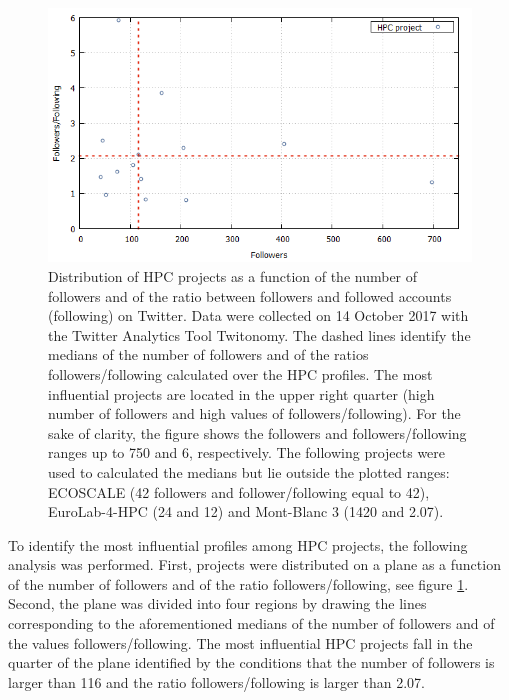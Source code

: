 \begin{figure}[!t] 
 \begin{center}
 \includegraphics[scale=0.4]{Images/HPC_influence.png}
 \caption{Distribution of HPC projects as a function of the number of followers and of the ratio between followers and followed accounts (following) on Twitter. Data were collected on 14 October 2017 with the Twitter Analytics Tool Twitonomy. The dashed lines identify the medians of the number of followers and of the ratios followers/following calculated over the HPC profiles. The most influential projects are located in the upper right quarter (high number of followers and high values of followers/following). For the sake of clarity, the figure shows the followers and followers/following ranges up to 750 and 6, respectively. The following projects were used to calculated the medians but lie outside the plotted ranges: ECOSCALE (42 followers and follower/following equal to 42), EuroLab-4-HPC (24 and 12) and Mont-Blanc 3 (1420 and 2.07).}
 \label{HPC_influence_plot}
 \end{center}
\end{figure}

To identify the most influential profiles among HPC projects, the following analysis was performed. First, projects were distributed on a plane as a function of the number of followers and of the ratio followers/following, see figure \ref{HPC_influence_plot}. Second, the plane was divided into four regions by drawing the lines corresponding to the aforementioned medians of the number of followers and of the values followers/following. The most influential HPC projects fall in the quarter of the plane identified by the conditions that the number of followers is larger than 116 and the ratio followers/following is larger than 2.07.

